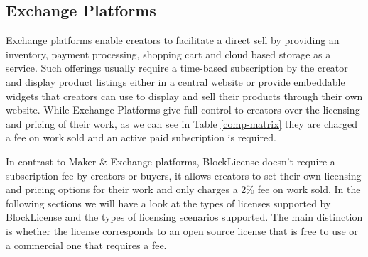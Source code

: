 
\subsection{Exchange Platforms}

Exchange platforms enable creators to facilitate a direct sell by providing an inventory, payment processing, shopping cart and cloud based storage as a service. Such offerings usually require a time-based subscription by the creator and display product listings either in a central website or provide embeddable widgets that creators can use to display and sell their products through their own website. While Exchange Platforms give full control to creators over the licensing and pricing of their work, as we can see in Table \ref{comp-matrix} they are charged a fee on work sold and an active paid subscription is required.
\newline

In contrast to Maker \& Exchange platforms, BlockLicense doesn't require a subscription fee by creators or buyers, it allows creators to set their own licensing and pricing options for their work and only charges a 2\%  fee on work sold. In the following sections we will have a look at the types of licenses supported by BlockLicense and the types of licensing scenarios supported. The main distinction is whether the license corresponds to an open source license that is free to use or a commercial one that requires a fee.
